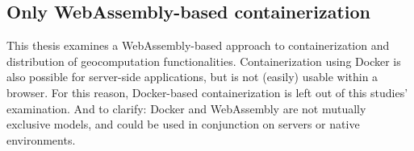 

\subsection*{Only WebAssembly-based containerization}

This thesis examines a WebAssembly-based approach to containerization and distribution of geocomputation functionalities. 
Containerization using Docker is also possible for server-side applications, but is not (easily) usable within a browser. 
For this reason, Docker-based containerization is left out of this studies' examination. 
And to clarify: Docker and WebAssembly are not mutually exclusive models, and could be used in conjunction on servers or native environments. 




